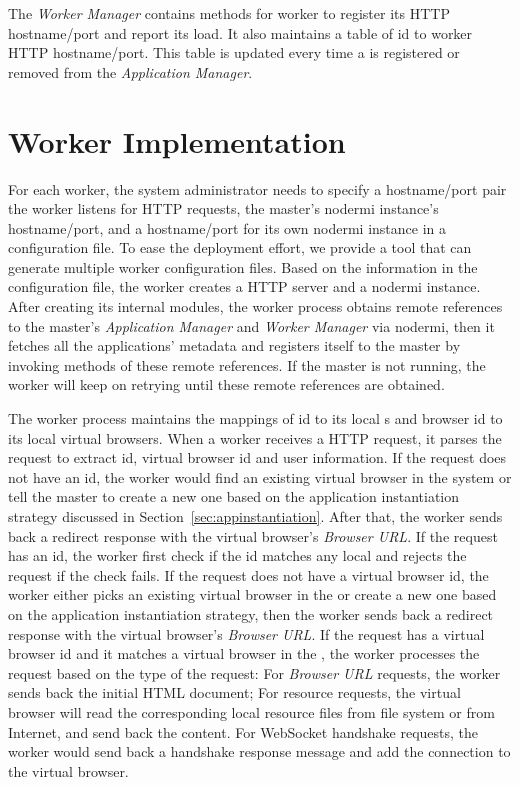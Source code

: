 The \emph{Worker Manager} contains methods for worker to register its HTTP
hostname/port and report its load. It also maintains a table of \appins{} id
to worker HTTP hostname/port. This table is updated every time a \appins{}
is registered or removed from the \emph{Application Manager}.




\section{Worker Implementation}
\label{sec:worker}

For each worker, the system administrator needs to specify a hostname/port
pair the worker listens for HTTP requests,  the master's nodermi instance's
hostname/port, and a hostname/port for its own nodermi instance in a
configuration file. To ease the deployment effort, we provide a tool that can
generate multiple worker configuration files. Based on the information in the
configuration file, the worker creates a HTTP server and a nodermi instance.
After creating its internal modules, the worker process obtains remote
references to the master's \emph{Application Manager} and \emph{Worker
Manager} via nodermi, then  it fetches all the applications' metadata and
registers itself to the master by invoking methods of these remote references.
If the master is not running, the worker will keep on retrying until these
remote references are obtained.

The worker process maintains the mappings of \appins{} id to its local
\appins{}s and browser id to its local virtual browsers.
When a worker receives a HTTP request, it parses the request to extract
\appins id, virtual browser id and user information. If the request does not
have an \appins id, the worker would find an existing virtual browser in the
system or tell the master to create a new one  based on the application
instantiation strategy discussed in Section~\ref{sec:appinstantiation}. After
that, the worker sends back a redirect response with the virtual browser's
\emph{Browser URL}. If the request has an \appins id, the worker first check
if the id matches any local \appins and rejects the request if the check
fails. If the request does not have a virtual browser id, the worker either
picks an existing virtual browser in the \appins  or create a new one based on
the application instantiation strategy, then the worker sends back a redirect
response with  the virtual browser's \emph{Browser URL}. If the request has a
virtual browser id and it matches a virtual browser in the \appins, the worker
processes the request based on the type of the request: For \emph{Browser URL}
requests, the worker sends back the initial  HTML document; For resource
requests, the virtual browser will read the corresponding local resource files
from file system or from Internet, and send back the content. For WebSocket
handshake requests, the worker would send back a handshake response message
and add the connection to the virtual browser.


